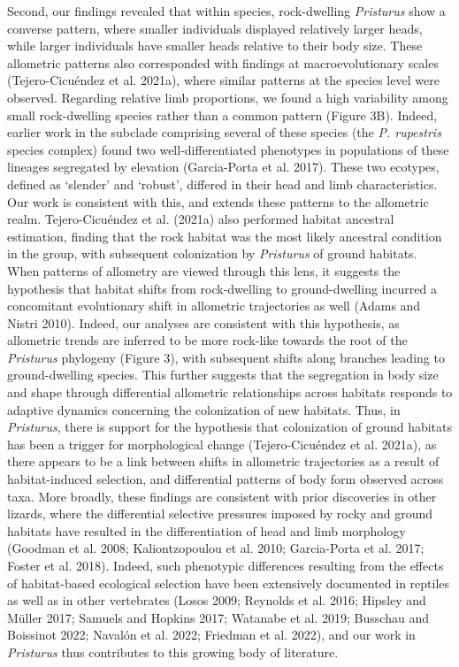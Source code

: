 \documentclass[
  11pt,
]{article}
\begin{document}
Second, our findings revealed that within species, rock-dwelling
\emph{Pristurus} show a converse pattern, where smaller individuals
displayed relatively larger heads, while larger individuals have smaller
heads relative to their body size. These allometric patterns also
corresponded with findings at macroevolutionary scales (Tejero-Cicuéndez
et al. 2021a), where similar patterns at the species level were
observed. Regarding relative limb proportions, we found a high
variability among small rock-dwelling species rather than a common
pattern (Figure 3B). Indeed, earlier work in the subclade comprising
several of these species (the \emph{P. rupestris} species complex) found
two well-differentiated phenotypes in populations of these lineages
segregated by elevation (Garcia-Porta et al. 2017). These two ecotypes,
defined as `slender' and `robust', differed in their head and limb
characteristics. Our work is consistent with this, and extends these
patterns to the allometric realm. Tejero-Cicuéndez et al. (2021a) also
performed habitat ancestral estimation, finding that the rock habitat
was the most likely ancestral condition in the group, with subsequent
colonization by \emph{Pristurus} of ground habitats. When patterns of
allometry are viewed through this lens, it suggests the hypothesis that
habitat shifts from rock-dwelling to ground-dwelling incurred a
concomitant evolutionary shift in allometric trajectories as well (Adams
and Nistri 2010). Indeed, our analyses are consistent with this
hypothesis, as allometric trends are inferred to be more rock-like
towards the root of the \emph{Pristurus} phylogeny (Figure 3), with
subsequent shifts along branches leading to ground-dwelling species.
This further suggests that the segregation in body size and shape
through differential allometric relationships across habitats responds
to adaptive dynamics concerning the colonization of new habitats. Thus,
in \emph{Pristurus}, there is support for the hypothesis that
colonization of ground habitats has been a trigger for morphological
change (Tejero-Cicuéndez et al. 2021a), as there appears to be a link
between shifts in allometric trajectories as a result of habitat-induced
selection, and differential patterns of body form observed across taxa.
More broadly, these findings are consistent with prior discoveries in
other lizards, where the differential selective pressures imposed by
rocky and ground habitats have resulted in the differentiation of head
and limb morphology (Goodman et al. 2008; Kaliontzopoulou et al. 2010;
Garcia-Porta et al. 2017; Foster et al. 2018). Indeed, such phenotypic
differences resulting from the effects of habitat-based ecological
selection have been extensively documented in reptiles as well as in
other vertebrates (Losos 2009; Reynolds et al. 2016; Hipsley and Müller
2017; Samuels and Hopkins 2017; Watanabe et al. 2019; Busschau and
Boissinot 2022; Navalón et al. 2022; Friedman et al. 2022), and our work
in \emph{Pristurus} thus contributes to this growing body of literature.
\hfill\break
\end{document}
